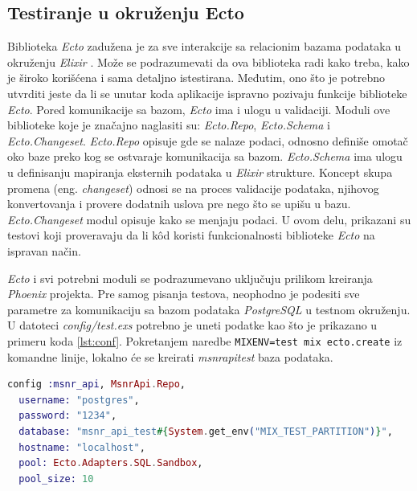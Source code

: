 \documentclass[12pt,oneside]{memoir}
\begin{document}
\subsection{Testiranje u okruženju Ecto}
\par Biblioteka \emph{Ecto} zadužena je za sve interakcije sa relacionim bazama podataka u okruženju \emph{Elixir} \cite{ecto}. Može se podrazumevati da ova biblioteka radi kako treba, kako je široko korišćena i sama detaljno istestirana. Međutim, ono što je potrebno utvrditi jeste da li se unutar koda aplikacije ispravno pozivaju funkcije biblioteke \emph{Ecto}.  Pored komunikacije sa bazom, \emph{Ecto} ima i ulogu u validaciji. Moduli ove biblioteke koje je značajno naglasiti su: \emph{Ecto.Repo}, \emph{Ecto.Schema} i \emph{Ecto.Changeset}. \emph{Ecto.Repo} opisuje gde se nalaze podaci, odnosno definiše omotač oko baze preko kog se ostvaraje komunikacija sa bazom. \emph{Ecto.Schema} ima ulogu u definisanju mapiranja eksternih podataka u \emph{Elixir} strukture. Koncept skupa promena (eng. \emph{changeset}) odnosi se na proces validacije podataka, njihovog konvertovanja i provere dodatnih uslova pre nego što se upišu u bazu. \emph{Ecto.Changeset} modul opisuje kako se menjaju podaci. U ovom delu, prikazani su testovi koji proveravaju da li k\^{o}d koristi funkcionalnosti biblioteke \emph{Ecto} na ispravan način.
\par \emph{Ecto} i svi potrebni moduli se podrazumevano uključuju prilikom kreiranja \emph{Phoenix} projekta. Pre samog pisanja testova, neophodno je podesiti sve parametre za komunikaciju sa bazom podataka \emph{PostgreSQL} u testnom okruženju. U datoteci \emph{config/test.exs} potrebno je uneti podatke kao što je prikazano u primeru koda \ref{lst:conf}. Pokretanjem naredbe \texttt{MIX{\textunderscore}ENV=test mix ecto.create} iz komandne linije, lokalno će se kreirati \emph{msnr{\textunderscore}api{\textunderscore}test} baza podataka.  \\

\begin{minipage}{\linewidth}
\begin{lstlisting}[language=elixir, basicstyle=\small, caption={Konfiguracija baze podataka u testnom okruženju},captionpos=b, label={lst:conf}]
  config :msnr_api, MsnrApi.Repo,
  username: "postgres",
  password: "1234",
  database: "msnr_api_test#{System.get_env("MIX_TEST_PARTITION")}",
  hostname: "localhost",
  pool: Ecto.Adapters.SQL.Sandbox,
  pool_size: 10
\end{lstlisting}
\end{minipage}
\end{document}
